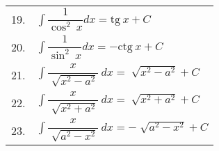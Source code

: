 \documentclass{article}
\begin{document}
\begin{table}[!ht]
\begin{minipage}{0.5\linewidth}
\begin{tabular}{|m{1cm}|m{6.5cm}|}
      19.          & $\displaystyle\int \dfrac{1}{\cos ^2\ x} dx = \text{tg}\ x + C $                                              \\

      20.          & $\displaystyle\int \dfrac{1}{\sin ^2\ x} dx = -\text{ctg}\ x + C $                                            \\

      21.          & $\displaystyle\int \dfrac{x}{\sqrt[]{x^2-a^2}}\ dx = \sqrt[]{x^2 - a^2} + C $                                 \\

      22.          & $\displaystyle\int \dfrac{x}{\sqrt[]{x^2+a^2}}\ dx = \sqrt[]{x^2 + a^2} + C $                                 \\

      23.          & $\displaystyle\int \dfrac{x}{\sqrt[]{a^2-x^2}}\ dx = -\sqrt[]{a^2 - x^2} + C $                                \\
    \end{tabular}
  \end{minipage}
\end{table}
\end{document}

